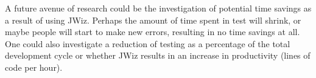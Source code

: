 A future avenue of research could be the investigation of potential time
savings as a result of using JWiz.  Perhaps the amount of time spent in
test will shrink, or maybe people will start to make new errors, resulting
in no time savings at all.  One could also investigate a reduction of
testing as a percentage of the total development cycle or whether JWiz
results in an increase in productivity (lines of code per hour).
































